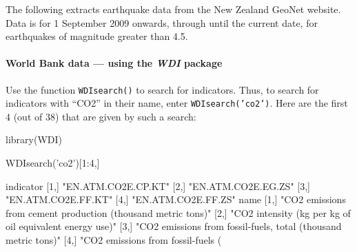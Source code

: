 \documentclass{tufte-book}\usepackage[]{graphicx}\usepackage[]{color}
\newcommand{\txtt}[1]{\texttt{#1}}
\begin{document}
  The following
extracts earthquake data from the New Zealand GeoNet
website.  Data is for 1 September 2009 onwards, through until the
current date, for earthquakes of magnitude greater than 4.5.
\begin{Schunk}
\end{Schunk}

\paragraph{World Bank data --- using the {\em WDI} package}

Use the function \txtt{WDIsearch()} to search for indicators.  Thus,
to search for indicators with ``CO2'' in their name, enter
\txtt{WDIsearch('co2')}.  Here are the first 4 (out of 38) that are
given by such a search:
\begin{fullwidth}
\begin{Schunk}
\begin{Sinput}
library(WDI)
\end{Sinput}
\begin{Sinput}
WDIsearch('co2')[1:4,]
\end{Sinput}
\begin{Soutput}
     indicator          
[1,] "EN.ATM.CO2E.CP.KT"
[2,] "EN.ATM.CO2E.EG.ZS"
[3,] "EN.ATM.CO2E.FF.KT"
[4,] "EN.ATM.CO2E.FF.ZS"
     name                                                           
[1,] "CO2 emissions from cement production (thousand metric tons)"  
[2,] "CO2 intensity (kg per kg of oil equivalent energy use)"       
[3,] "CO2 emissions from fossil-fuels, total (thousand metric tons)"
[4,] "CO2 emissions from fossil-fuels (%
\end{Soutput}
\end{Schunk}
\end{fullwidth}
\end{document}
